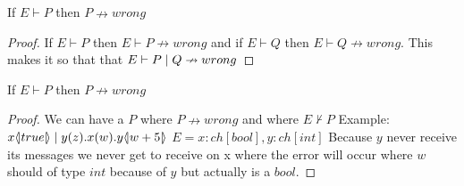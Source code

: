 \begin{theorem}
If \ensuremath{E\vdash P} then \ensuremath{P\nrightarrow wrong}

\begin{proof}
If \ensuremath{E \vdash P} then \ensuremath{E \vdash P \nrightarrow wrong} and if \ensuremath{E \vdash Q} then \ensuremath{E \vdash Q \nrightarrow wrong}. This makes it so that that \ensuremath{E \vdash P \para Q \nrightarrow wrong}
\end{proof}

\end{theorem}



\begin{theorem}
If \ensuremath{E \vdash P} then \ensuremath{P \nrightarrow wrong}
\begin{proof}
We can have a \ensuremath{P} where \ensuremath{P \nrightarrow wrong} and where \ensuremath{E \nvdash P}
Example: \ensuremath{\lift{x}{true}\para \inp{y}{z}\inp{x}{w}\lift{y}{w+5}} \ensuremath{E=x:ch[bool], y:ch[int]} Because \ensuremath{y} never receive its messages we never get to receive on x where the error will occur where \ensuremath{w} should of type \ensuremath{int} because of \ensuremath{y} but actually is a \ensuremath{bool}.
\end{proof}
\end{theorem}

